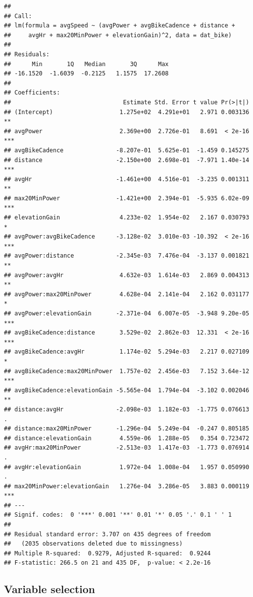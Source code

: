 \documentclass[
]{book}
\begin{document}
\begin{verbatim}
## 
## Call:
## lm(formula = avgSpeed ~ (avgPower + avgBikeCadence + distance + 
##     avgHr + max20MinPower + elevationGain)^2, data = dat_bike)
## 
## Residuals:
##      Min       1Q   Median       3Q      Max 
## -16.1520  -1.6039  -0.2125   1.1575  17.2608 
## 
## Coefficients:
##                                Estimate Std. Error t value Pr(>|t|)    
## (Intercept)                   1.275e+02  4.291e+01   2.971 0.003136 ** 
## avgPower                      2.369e+00  2.726e-01   8.691  < 2e-16 ***
## avgBikeCadence               -8.207e-01  5.625e-01  -1.459 0.145275    
## distance                     -2.150e+00  2.698e-01  -7.971 1.40e-14 ***
## avgHr                        -1.461e+00  4.516e-01  -3.235 0.001311 ** 
## max20MinPower                -1.421e+00  2.394e-01  -5.935 6.02e-09 ***
## elevationGain                 4.233e-02  1.954e-02   2.167 0.030793 *  
## avgPower:avgBikeCadence      -3.128e-02  3.010e-03 -10.392  < 2e-16 ***
## avgPower:distance            -2.345e-03  7.476e-04  -3.137 0.001821 ** 
## avgPower:avgHr                4.632e-03  1.614e-03   2.869 0.004313 ** 
## avgPower:max20MinPower        4.628e-04  2.141e-04   2.162 0.031177 *  
## avgPower:elevationGain       -2.371e-04  6.007e-05  -3.948 9.20e-05 ***
## avgBikeCadence:distance       3.529e-02  2.862e-03  12.331  < 2e-16 ***
## avgBikeCadence:avgHr          1.174e-02  5.294e-03   2.217 0.027109 *  
## avgBikeCadence:max20MinPower  1.757e-02  2.456e-03   7.152 3.64e-12 ***
## avgBikeCadence:elevationGain -5.565e-04  1.794e-04  -3.102 0.002046 ** 
## distance:avgHr               -2.098e-03  1.182e-03  -1.775 0.076613 .  
## distance:max20MinPower       -1.296e-04  5.249e-04  -0.247 0.805185    
## distance:elevationGain        4.559e-06  1.288e-05   0.354 0.723472    
## avgHr:max20MinPower          -2.513e-03  1.417e-03  -1.773 0.076914 .  
## avgHr:elevationGain           1.972e-04  1.008e-04   1.957 0.050990 .  
## max20MinPower:elevationGain   1.276e-04  3.286e-05   3.883 0.000119 ***
## ---
## Signif. codes:  0 '***' 0.001 '**' 0.01 '*' 0.05 '.' 0.1 ' ' 1
## 
## Residual standard error: 3.707 on 435 degrees of freedom
##   (2035 observations deleted due to missingness)
## Multiple R-squared:  0.9279,	Adjusted R-squared:  0.9244 
## F-statistic: 266.5 on 21 and 435 DF,  p-value: < 2.2e-16
\end{verbatim}

\hypertarget{variable-selection}{%
\subsection{Variable selection}\label{variable-selection}}
\end{document}
